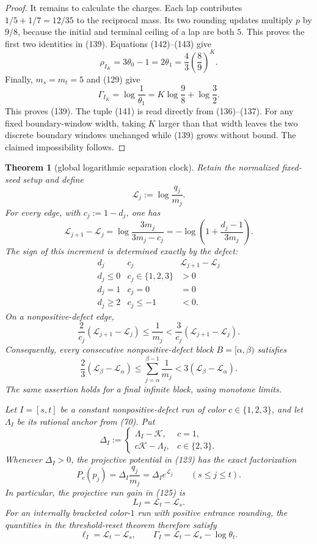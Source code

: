 \documentclass[11pt]{article}
\newtheorem{theorem}{Theorem}
\begin{document}
\begin{proof}
It remains to calculate the charges.  Each lap contributes
$1/5+1/7=12/35$ to the reciprocal mass.  Its two rounding updates multiply
$p$ by $9/8$, because the initial and terminal ceiling of a lap are both
$5$.  This proves the first two identities in (139).  Equations
(142)--(143) give
\[
  \rho_{I_K}=3\theta_0-1=2\theta_1
  =\frac43\left(\frac89\right)^K.
\tag{154}
\]
Finally, $m_s=m_t=5$ and (129) give
\[
  \Gamma_{I_K}
  =\log\frac1{\theta_1}
  =K\log\frac98+\log\frac32.
\tag{155}
\]
This proves (139).  The tuple (141) is read directly from (136)--(137).
For any fixed boundary-window width, taking $K$ larger than that width
leaves the two discrete boundary windows unchanged while (139) grows
without bound.  The claimed impossibility follows.
\end{proof}

\begin{theorem}[global logarithmic separation clock]
Retain the normalized fixed-seed setup and define
\[
  \mathcal L_j:=\log\frac{q_j}{m_j}.
\tag{156}
\]
For every edge, with $c_j:=1-d_j$, one has
\[
\boxed{
  \mathcal L_{j+1}-\mathcal L_j
  =\log\frac{3m_j}{3m_j-c_j}
  =-\log\left(1+\frac{d_j-1}{3m_j}\right).}
\tag{157}
\]
The sign of this increment is determined exactly by the defect:
\[
\begin{array}{c|c|c}
d_j&c_j&\mathcal L_{j+1}-\mathcal L_j\\ \hline
d_j\leq0&c_j\in\{1,2,3\}&>0\\
d_j=1&c_j=0&=0\\
d_j\geq2&c_j\leq-1&<0.
\end{array}
\tag{158}
\]
On a nonpositive-defect edge,
\[
\boxed{
  \frac2{c_j}(\mathcal L_{j+1}-\mathcal L_j)
  \leq\frac1{m_j}
  <\frac3{c_j}(\mathcal L_{j+1}-\mathcal L_j).}
\tag{159}
\]
Consequently, every consecutive nonpositive-defect block
$B=[\alpha,\beta)$ satisfies
\[
\boxed{
  \frac23(\mathcal L_\beta-\mathcal L_\alpha)
  \leq\sum_{j=\alpha}^{\beta-1}\frac1{m_j}
  <3(\mathcal L_\beta-\mathcal L_\alpha).}
\tag{160}
\]
The same assertion holds for a final infinite block, using monotone
limits.

Let $I=[s,t]$ be a constant nonpositive-defect run of color
$c\in\{1,2,3\}$, and let $\Lambda_I$ be its rational anchor from (70).
Put
\[
  \Delta_I:=
  \begin{cases}
    \Lambda_I-\mathcal K,&c=1,\\
    c\mathcal K-\Lambda_I,&c\in\{2,3\}.
  \end{cases}
\tag{161}
\]
Whenever $\Delta_I>0$, the projective potential in (123) has the exact
factorization
\[
\boxed{
  P_c(p_j)=\Delta_I\frac{q_j}{m_j}
  =\Delta_I e^{\mathcal L_j}
  \qquad(s\leq j\leq t).}
\tag{162}
\]
In particular, the projective run gain in (125) is
\[
\boxed{L_I=\mathcal L_t-\mathcal L_s.}
\tag{163}
\]
For an internally bracketed color-$1$ run with positive entrance rounding,
the quantities in the threshold-reset theorem therefore satisfy
\[
\boxed{
  \ell_I=\mathcal L_t-\mathcal L_s,
  \qquad
  \Gamma_I=\mathcal L_t-\mathcal L_s-\log\theta_t.}
\tag{164}
\]


\end{theorem}
\end{document}

